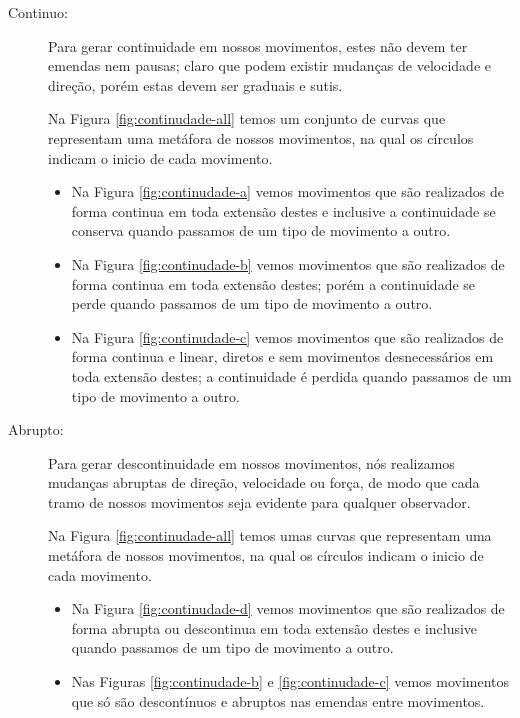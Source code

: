 \begin{description}
\item[Continuo:] Para gerar continuidade em nossos movimentos,
estes não devem ter emendas nem pausas; 
claro que podem existir mudanças de velocidade e direção,
porém estas devem ser graduais e sutis.
\begin{example} 
Na Figura \ref{fig:continudade-all} temos um conjunto de curvas que representam uma metáfora de nossos movimentos,
na qual os círculos indicam o inicio de cada movimento.
\begin{itemize}
\item Na Figura \ref{fig:continudade-a} vemos movimentos que são realizados de forma continua 
em toda extensão destes  
e inclusive a continuidade se conserva quando passamos de um tipo de movimento a outro.
\item Na Figura \ref{fig:continudade-b} vemos movimentos que são realizados de forma continua  
em toda extensão destes;
porém a continuidade se perde quando passamos de um tipo de movimento a outro.
\item Na Figura \ref{fig:continudade-c} vemos movimentos que são realizados de forma continua e linear,
diretos e sem movimentos desnecessários em toda extensão destes;
a continuidade é perdida quando passamos de um tipo de movimento a outro.
\end{itemize}
\end{example}

\item[Abrupto:] Para gerar descontinuidade em nossos movimentos, 
nós realizamos mudanças abruptas de direção, velocidade ou força,
de modo que cada tramo de nossos movimentos seja evidente para qualquer observador.
\begin{example}
Na Figura \ref{fig:continudade-all} temos umas curvas que representam uma metáfora de nossos movimentos,
na qual os círculos indicam o inicio de cada movimento.
\begin{itemize}
\item Na Figura \ref{fig:continudade-d} vemos movimentos que são realizados de forma abrupta ou descontinua 
em toda extensão destes 
e inclusive quando passamos de um tipo de movimento a outro.
\item Nas Figuras \ref{fig:continudade-b} e \ref{fig:continudade-c} 
vemos movimentos que só são descontínuos e abruptos nas emendas entre movimentos. 
\end{itemize}
\end{example}
\end{description}

